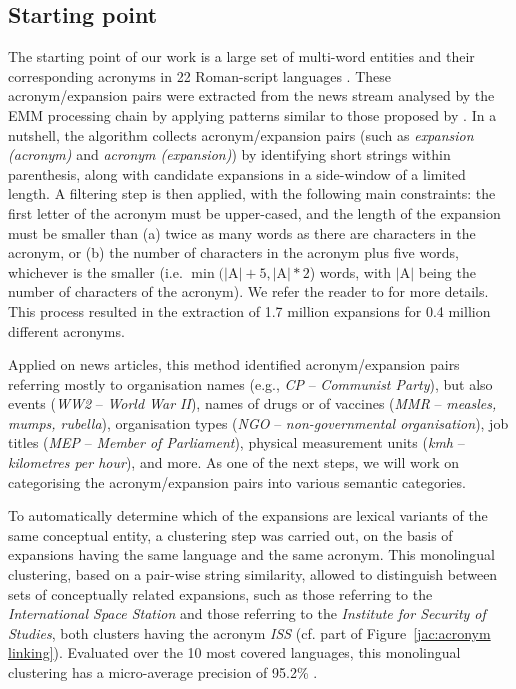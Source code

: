 \documentclass[output=paper]{langsci/langscibook}
\begin{document}
\subsection{Starting point}
\label{jac:starting}

The starting point of our work is a large set of multi-word entities
and their corresponding acronyms in 22 Roman-script languages
\citep{ehrmann-13}. These acronym/expansion pairs were extracted from
the news stream analysed by the EMM processing chain by applying
patterns similar to those proposed by \citet{schwartz-03}. In a
nutshell, the algorithm collects acronym/expansion pairs (such as
\textit{expansion (acronym)} and \textit{acronym (expansion)}) by
identifying short strings within parenthesis, along with candidate
expansions in a side-window of a limited length. A filtering step is
then applied, with the following main constraints: the first letter of
the acronym must be upper-cased, and the length of the expansion must
be smaller than (a) twice as many words as there are characters in the
acronym, or (b) the number of characters in the acronym plus five
words, whichever is the smaller (i.e. $\min(\vert$A$\vert+5,
\vert$A$\vert*2$) words, with $\vert$A$\vert$ being the number of
characters of the acronym). We refer the reader to \citet{schwartz-03}
for more details.  This process resulted in the extraction of 1.7
million expansions for 0.4 million different acronyms.

Applied on news articles, this method identified acronym/expansion
pairs referring mostly to organisation names (e.g.,  \textit{CP} –
\textit{Communist Party}), but also events (\textit{WW2} –
\textit{World War II}), names of drugs or of vaccines (\textit{MMR} –
\textit{measles, mumps, rubella}), organisation types (\textit{NGO} –
\textit{non-governmental organisation}), job titles (\textit{MEP} –
\textit{Member of Parliament}), physical measurement units
(\textit{kmh} – \textit{kilometres per hour}), and more. As one of the
next steps, we will work on categorising the acronym/expansion pairs
into various semantic categories.

To automatically determine which of the expansions are lexical
variants of the same conceptual entity, a clustering step was carried
out, on the basis of expansions having the same language and the same
acronym. This monolingual clustering, based on a pair-wise string
similarity, allowed to distinguish between sets of conceptually
related expansions, such as those referring to the
\textit{International Space Station} and those referring to the
\textit{Institute for Security of Studies}, both clusters having the
acronym \textit{ISS} (cf.  part of Figure~\ref{jac:acronym
  linking}).  Evaluated over the 10 most covered languages, this
monolingual clustering has a micro-average precision of 95.2\%
\citep{jacquet-14}.
\end{document}
